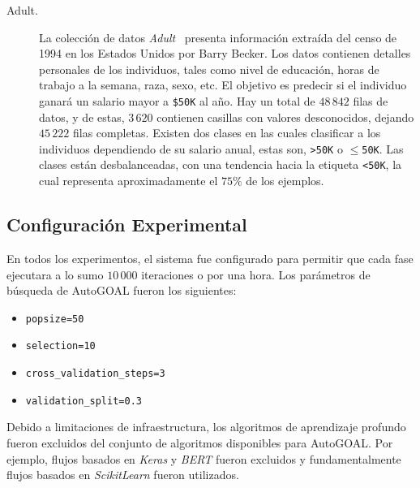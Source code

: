 \begin{description}
\item[Adult.]
La colección de datos \emph{Adult}~\parencite{ucidata} presenta información extraída del censo de 1994 en los Estados Unidos por Barry Becker.
Los datos contienen detalles personales de los individuos, tales como nivel de educación, horas de trabajo a la semana, raza, sexo, etc.
El objetivo es predecir si el individuo ganará un salario mayor a \texttt{\$50K} al año.
Hay un total de $48\,842$ filas de datos, y de estas, $3\,620$ contienen casillas con valores desconocidos, dejando $45\,222$ filas completas.
Existen dos clases en las cuales clasificar a los individuos dependiendo de su salario anual, estas son, \texttt{>50K} o \texttt{$\leq$50K}.
Las clases están desbalanceadas, con una tendencia hacia la etiqueta \texttt{<50K}, la cual representa aproximadamente el $75\%$ de los ejemplos.

\end{description}

\subsection{Configuración Experimental}\label{section:experimental-setup}

En todos los experimentos, el sistema fue configurado para permitir que cada fase ejecutara a lo sumo $10\,000$ iteraciones o por una hora.
Los parámetros de búsqueda de AutoGOAL fueron los siguientes:
\begin{itemize}
    \item \texttt{popsize=50}
    \item \texttt{selection=10}
    \item \texttt{cross\_validation\_steps=3}
    \item \texttt{validation\_split=0.3}
\end{itemize}

Debido a limitaciones de infraestructura, los algoritmos de aprendizaje profundo fueron excluidos del conjunto de algoritmos disponibles para AutoGOAL.
Por ejemplo, flujos basados en \emph{Keras} y \emph{BERT} fueron excluidos y fundamentalmente flujos basados en \emph{ScikitLearn} fueron utilizados.

